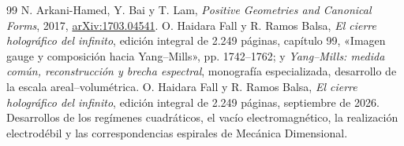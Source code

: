 \documentclass[a4paper,10pt]{article}
\theoremstyle{definition}\newtheorem{definition}[theorem]{Definición}
\theoremstyle{remark}\newtheorem{remark}[theorem]{Observación}
\numberwithin{equation}{section}
\begin{document}
\begin{thebibliography}{99}
 N. Arkani-Hamed, Y. Bai y T. Lam,
\emph{Positive Geometries and Canonical Forms}, 2017,
\href{https://arxiv.org/abs/1703.04541}{arXiv:1703.04541}.
 O. Haidara Fall y R. Ramos Balsa,
\emph{El cierre holográfico del infinito}, edición integral de 2.249 páginas,
capítulo 99, «Imagen gauge y composición hacia Yang--Mills», pp. 1742--1762;
y \emph{Yang--Mills: medida común, reconstrucción y brecha espectral},
monografía especializada, desarrollo de la escala areal--volumétrica.
 O. Haidara Fall y R. Ramos Balsa,
\emph{El cierre holográfico del infinito}, edición integral de 2.249 páginas,
septiembre de 2026. Desarrollos de los regímenes cuadráticos, el vacío
electromagnético, la realización electrodébil y las correspondencias
espirales de Mecánica Dimensional.

\end{thebibliography}
\end{document}
